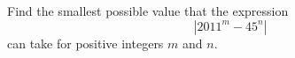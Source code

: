 Find the smallest possible value that the expression
$$\left| 2011^m - 45^n \right|$$
can take for positive integers $m$ and $n$.